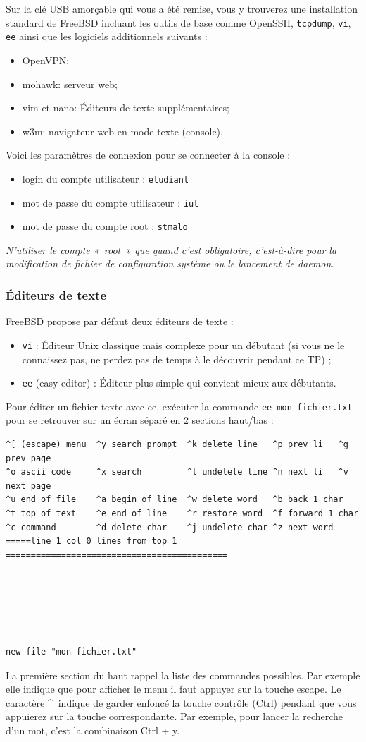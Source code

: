 \documentclass[a4paper,11pt]{article}
\newcommand{\shellcmd}[1]{\texttt{#1}}
\begin{document}
Sur la clé USB amorçable qui vous a été remise, vous y trouverez une installation standard de FreeBSD incluant les outils de base comme OpenSSH, \shellcmd{tcpdump}, \shellcmd{vi}, \shellcmd{ee} ainsi que les logiciels additionnels suivants :
\begin{itemize}
\item OpenVPN;
\item mohawk: serveur web;
\item vim et nano: Éditeurs de texte supplémentaires;
\item w3m: navigateur web en mode texte (console).
\end{itemize}
Voici les paramètres de connexion pour se connecter à la console :
\begin{itemize}
\item login du compte utilisateur : \shellcmd{etudiant}
\item mot de passe du compte utilisateur : \shellcmd{iut}
\item mot de passe du compte root : \shellcmd{stmalo}
\end{itemize}
\emph{N'utiliser le compte «~root~» que quand c'est obligatoire, c'est-à-dire pour la modification de fichier de configuration système ou le lancement de daemon.}
\subsubsection{Éditeurs de texte}
FreeBSD propose par défaut deux éditeurs de texte :
\begin{itemize}
\item \shellcmd{vi} : Éditeur Unix classique mais complexe pour un débutant (si vous ne le connaissez pas, ne perdez pas de temps à le découvrir pendant ce TP) ;
\item \shellcmd{ee} (easy editor) : Éditeur plus simple qui convient mieux aux débutants.
\end{itemize}
Pour éditer un fichier texte avec ee, exécuter la commande \shellcmd{ee mon-fichier.txt} pour se retrouver sur un écran séparé en 2 sections haut/bas :
\footnotesize
\begin{verbatim}
^[ (escape) menu  ^y search prompt  ^k delete line   ^p prev li   ^g prev page
^o ascii code     ^x search         ^l undelete line ^n next li   ^v next page
^u end of file    ^a begin of line  ^w delete word   ^b back 1 char
^t top of text    ^e end of line    ^r restore word  ^f forward 1 char
^c command        ^d delete char    ^j undelete char ^z next word
=====line 1 col 0 lines from top 1 ============================================






new file "mon-fichier.txt"
\end{verbatim}
\normalsize
La première section du haut rappel la liste des commandes possibles. Par exemple elle indique que pour afficher le menu il faut appuyer sur la touche escape. Le caractère \textasciicircum \ indique de garder enfoncé la touche contrôle (Ctrl) pendant que vous appuierez sur la touche correspondante. Par exemple, pour lancer la recherche d'un mot, c'est la combinaison Ctrl + y.
\end{document}
